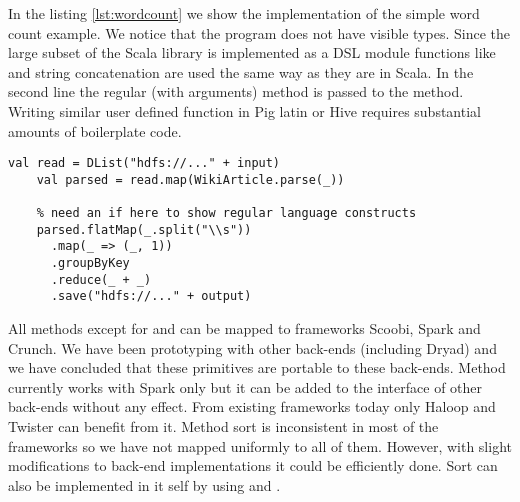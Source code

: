 In the listing \ref{lst:wordcount} we show the implementation of the simple word count example. We notice that the program does not have visible  types. Since the large subset of the Scala library is implemented as a DSL module functions like  and string concatenation are used the same way as they are in Scala. In the second line the regular (with  arguments) method is passed to the  method. Writing similar user defined function in Pig latin or Hive requires substantial amounts of boilerplate code.  

\begin{lstlisting}[name=code, caption=Example of word count program where type inference removes the need to declare any \scode{Rep} types., captionpos=b, label=lst:wordcount, float=t]
    val read = DList("hdfs://..." + input)
    val parsed = read.map(WikiArticle.parse(_))
    
    % need an if here to show regular language constructs
    parsed.flatMap(_.split("\\s"))
      .map(_ => (_, 1))
      .groupByKey
      .reduce(_ + _)
      .save("hdfs://..." + output)

\end{lstlisting}

All methods except for  and  can be mapped to frameworks Scoobi, Spark and Crunch. We have been prototyping with other back-ends (including Dryad) and we have concluded that these primitives are portable to these back-ends. Method  currently works with Spark  only but it can be added to the interface of other back-ends without any effect. From existing frameworks today only Haloop and Twister  can benefit from it. Method sort is inconsistent in most of the frameworks so we have not mapped uniformly to all of them. However, with slight modifications to back-end implementations it could be efficiently done. Sort can also be implemented in \tool it self by using  and .